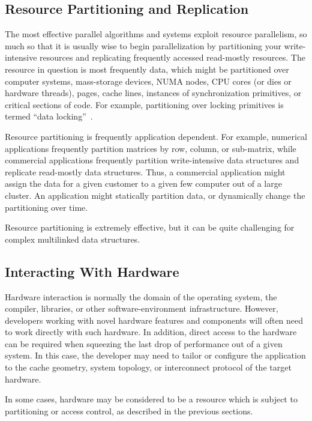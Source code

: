 \subsection{Resource Partitioning and Replication}
\label{sec:Resource Partitioning and Replication}

The most effective parallel algorithms and systems exploit resource
parallelism, so much so that it is
usually wise to begin parallelization by partitioning your write-intensive
resources and replicating frequently accessed read-mostly resources.
The resource in question is most frequently data, which might be
partitioned over computer systems, mass-storage devices, NUMA nodes,
CPU cores (or dies or hardware threads), pages, cache lines, instances
of synchronization primitives, or critical sections of code.
For example, partitioning over locking primitives is termed
``data locking''~\cite{Beck85}.

Resource partitioning is frequently application dependent.
For example, numerical applications frequently partition matrices
by row, column, or sub-matrix, while commercial applications frequently
partition write-intensive data structures and replicate
read-mostly data structures.
Thus, a commercial application might assign the data for a
given customer to a given few computer out of a large cluster.
An application might statically partition data, or dynamically
change the partitioning over time.

Resource partitioning is extremely effective, but
it can be quite challenging for complex multilinked data
structures.

\subsection{Interacting With Hardware}
\label{sec:Interacting With Hardware}

Hardware interaction is normally the domain of the operating system,
the compiler, libraries, or other software-environment infrastructure.
However, developers working with novel hardware features and components
will often need to work directly with such hardware.
In addition, direct access to the hardware can be required when squeezing
the last drop of performance out of a given system.
In this case, the developer may need to tailor or configure the application
to the cache geometry, system topology, or interconnect protocol of the
target hardware.

In some cases, hardware may be considered to be a resource which
is subject to partitioning or access control, as described in
the previous sections.

